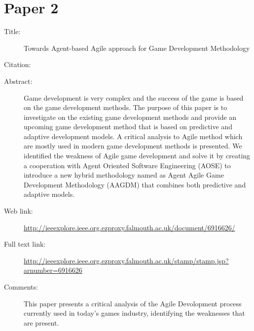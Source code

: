 \documentclass{scrartcl}
\begin{document}
\section*{Paper 2}
\begin{description}
\item[Title:] Towards Agent-based Agile approach for Game Development Methodology
\item[Citation:] \cite{bibtex_key}
\item[Abstract:] Game development is very complex and the success of the game is based on the game development methods. The purpose of this paper is to investigate on the existing game development methods and provide an upcoming game development method that is based on predictive and adaptive development models. A critical analysis to Agile method which are mostly used in modern game development methods is presented. We identified the weakness of Agile game development and solve it by creating a cooperation with Agent Oriented Software Engineering (AOSE) to introduce a new hybrid methodology named as Agent Agile Game Development Methodology (AAGDM) that combines both predictive and adaptive models.
\item[Web link:] \url{http://ieeexplore.ieee.org.ezproxy.falmouth.ac.uk/document/6916626/}
\item[Full text link:] \url{http://ieeexplore.ieee.org.ezproxy.falmouth.ac.uk/stamp/stamp.jsp?arnumber=6916626}
\item[Comments:] This paper presents a critical analysis of the Agile Devolopment process currently used in today's games industry, identifying the weaknesses that are present.
\end{description}
\end{document}
